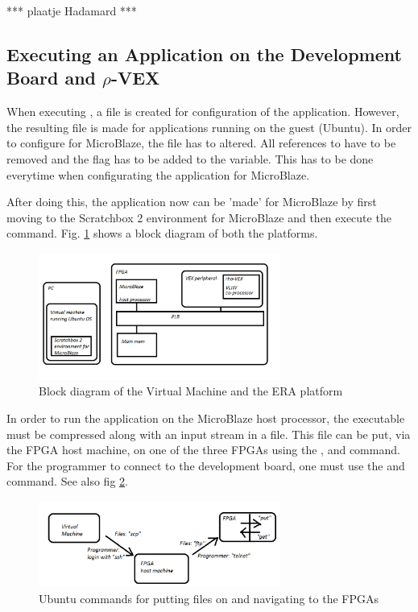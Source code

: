 *** plaatje Hadamard ***

\subsection{Executing an Application on the Development Board and $\rho$-VEX}

When executing , a file is created for configuration of the application. However, the resulting  file is made for applications running on the guest (Ubuntu). In order to configure for MicroBlaze, the  file has to altered. All references to  have to be removed and the  flag has to be added to the  variable. This has to be done everytime when configurating the application for MicroBlaze.

After doing this, the application now can be 'made' for MicroBlaze by first moving to the Scratchbox 2 environment for MicroBlaze and then execute the  command. Fig. \ref{fig:lelijk} shows a block diagram of both the platforms.

\begin{figure}[htb]%
\centering
\includegraphics[width=300px]{Pictures/Platform_paint}%
\caption{Block diagram of the Virtual Machine and the ERA platform}%
\label{fig:lelijk}%
\end{figure}

In order to run the application on the MicroBlaze host processor, the  executable must be compressed along with an input stream in a  file. This file can be put, via the FPGA host machine, on one of the three FPGAs using the ,  and  command. For the programmer to connect to the development board, one must use the  and  command. See also fig \ref{fig:hoppen}.

\begin{figure}[htb]%
\centering
\includegraphics[width=300px]{Pictures/hop}%
\caption{Ubuntu commands for putting files on and navigating to the FPGAs}%
\label{fig:hoppen}%
\end{figure}

